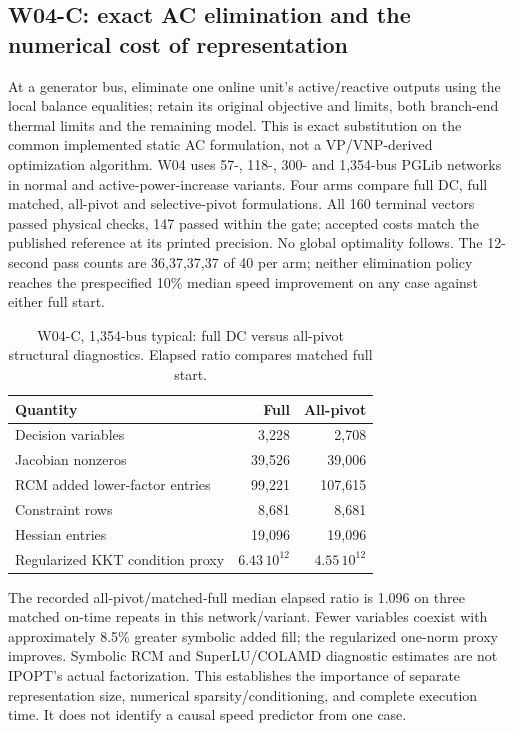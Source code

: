 \documentclass[11pt,letterpaper]{article}
\begin{document}
\subsection{W04-C: exact AC elimination and the numerical cost of representation}
At a generator bus, eliminate one online unit's active/reactive outputs using the local balance equalities; retain its original objective and limits, both branch-end thermal limits and the remaining model. This is exact substitution on the common implemented static AC formulation, not a VP/VNP-derived optimization algorithm. W04 uses 57-, 118-, 300- and 1,354-bus PGLib networks in normal and active-power-increase variants. Four arms compare full DC, full matched, all-pivot and selective-pivot formulations. All 160 terminal vectors passed physical checks, 147 passed within the gate; accepted costs match the published reference at its printed precision. No global optimality follows. The 12-second pass counts are 36,37,37,37 of 40 per arm; neither elimination policy reaches the prespecified 10\% median speed improvement on any case against either full start.

\begin{table}[htbp]\centering\small
\caption{W04-C, 1,354-bus typical: full DC versus all-pivot structural diagnostics. Elapsed ratio compares matched full start.}
\begin{tabular}{lrr}\toprule
Quantity & Full & All-pivot\\\midrule
Decision variables &3,228&2,708\\
Jacobian nonzeros &39,526&39,006\\
RCM added lower-factor entries &99,221&107,615\\
Constraint rows &8,681&8,681\\
Hessian entries &19,096&19,096\\
Regularized KKT condition proxy &$6.43\,10^{12}$&$4.55\,10^{12}$\\\bottomrule
\end{tabular}
\end{table}

The recorded all-pivot/matched-full median elapsed ratio is 1.096 on three matched on-time repeats in this network/variant. Fewer variables coexist with approximately 8.5\% greater symbolic added fill; the regularized one-norm proxy improves. Symbolic RCM and SuperLU/COLAMD diagnostic estimates are not IPOPT's actual factorization. This establishes the importance of separate representation size, numerical sparsity/conditioning, and complete execution time. It does not identify a causal speed predictor from one case.
\end{document}
